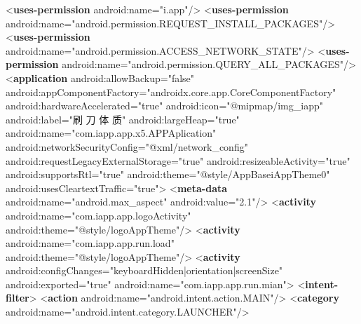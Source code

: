 \documentclass[
]{article}
\newenvironment{Shaded}{}{}
\newcommand{\KeywordTok}[1]{\textcolor[rgb]{0.00,0.44,0.13}{\textbf{#1}}}
\newcommand{\NormalTok}[1]{#1}
\newcommand{\OtherTok}[1]{\textcolor[rgb]{0.00,0.44,0.13}{#1}}
\newcommand{\StringTok}[1]{\textcolor[rgb]{0.25,0.44,0.63}{#1}}
\begin{document}
\begin{Shaded}
\begin{Highlighting}[]
\NormalTok{    \textless{}}\KeywordTok{uses{-}permission}\OtherTok{ android:name=}\StringTok{"i.app"}\NormalTok{/\textgreater{}}
\NormalTok{    \textless{}}\KeywordTok{uses{-}permission}\OtherTok{ android:name=}\StringTok{"android.permission.REQUEST\_INSTALL\_PACKAGES"}\NormalTok{/\textgreater{}}
\NormalTok{    \textless{}}\KeywordTok{uses{-}permission}\OtherTok{ android:name=}\StringTok{"android.permission.ACCESS\_NETWORK\_STATE"}\NormalTok{/\textgreater{}}
\NormalTok{    \textless{}}\KeywordTok{uses{-}permission}\OtherTok{ android:name=}\StringTok{"android.permission.QUERY\_ALL\_PACKAGES"}\NormalTok{/\textgreater{}}
\NormalTok{    \textless{}}\KeywordTok{application}\OtherTok{ android:allowBackup=}\StringTok{"false"}\OtherTok{ android:appComponentFactory=}\StringTok{"androidx.core.app.CoreComponentFactory"}\OtherTok{ android:hardwareAccelerated=}\StringTok{"true"}\OtherTok{ android:icon=}\StringTok{"@mipmap/img\_iapp"}\OtherTok{ android:label=}\StringTok{"刷 刀 体 质"}\OtherTok{ android:largeHeap=}\StringTok{"true"}\OtherTok{ android:name=}\StringTok{"com.iapp.app.x5.APPAplication"}\OtherTok{ android:networkSecurityConfig=}\StringTok{"@xml/network\_config"}\OtherTok{ android:requestLegacyExternalStorage=}\StringTok{"true"}\OtherTok{ android:resizeableActivity=}\StringTok{"true"}\OtherTok{ android:supportsRtl=}\StringTok{"true"}\OtherTok{ android:theme=}\StringTok{"@style/AppBaseiAppTheme0"}\OtherTok{ android:usesCleartextTraffic=}\StringTok{"true"}\NormalTok{\textgreater{}}
\NormalTok{        \textless{}}\KeywordTok{meta{-}data}\OtherTok{ android:name=}\StringTok{"android.max\_aspect"}\OtherTok{ android:value=}\StringTok{"2.1"}\NormalTok{/\textgreater{}}
\NormalTok{        \textless{}}\KeywordTok{activity}\OtherTok{ android:name=}\StringTok{"com.iapp.app.logoActivity"}\OtherTok{ android:theme=}\StringTok{"@style/logoAppTheme"}\NormalTok{/\textgreater{}}
\NormalTok{        \textless{}}\KeywordTok{activity}\OtherTok{ android:name=}\StringTok{"com.iapp.app.run.load"}\OtherTok{ android:theme=}\StringTok{"@style/logoAppTheme"}\NormalTok{/\textgreater{}}
\NormalTok{        \textless{}}\KeywordTok{activity}\OtherTok{ android:configChanges=}\StringTok{"keyboardHidden|orientation|screenSize"}\OtherTok{ android:exported=}\StringTok{"true"}\OtherTok{ android:name=}\StringTok{"com.iapp.app.run.mian"}\NormalTok{\textgreater{}}
\NormalTok{            \textless{}}\KeywordTok{intent{-}filter}\NormalTok{\textgreater{}}
\NormalTok{                \textless{}}\KeywordTok{action}\OtherTok{ android:name=}\StringTok{"android.intent.action.MAIN"}\NormalTok{/\textgreater{}}
\NormalTok{                \textless{}}\KeywordTok{category}\OtherTok{ android:name=}\StringTok{"android.intent.category.LAUNCHER"}\NormalTok{/\textgreater{}}

\end{Highlighting}
\end{Shaded}
\end{document}
